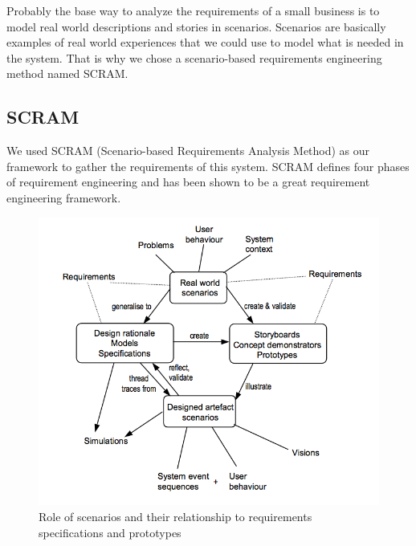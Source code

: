 Probably the base way to analyze the requirements of a small business is to model real world descriptions and stories in scenarios. Scenarios are basically examples of real world experiences that we could use to model what is needed in the system. That is why we chose a scenario-based requirements engineering method named SCRAM.

\subsection{SCRAM}
We used SCRAM (Scenario-based Requirements Analysis Method) as our framework to gather the requirements of this system.
SCRAM defines four phases of requirement engineering and has been shown to be a great requirement engineering framework.


\begin{figure}[htb!p]
\centering
\includegraphics[width=\linewidth]{fig/REscenario.png}
  \caption{Role of scenarios and their relationship to requirements specifications and prototypes ~\cite{REScenario}}
\label{fig:REscenario}
\end{figure}


